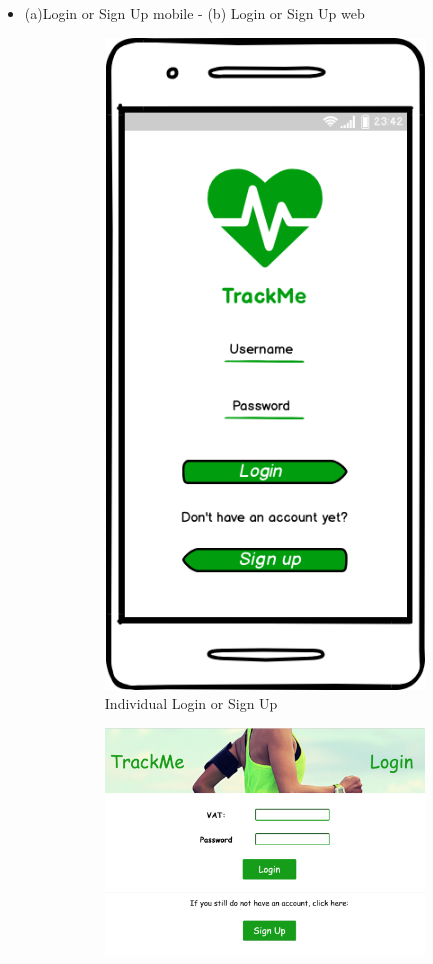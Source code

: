 \documentclass{article}
\begin{document}
\begin{legal}
\begin{legal}
\begin{legal}
{					\begin{itemize}
    					\item (a)Login or Sign Up mobile - (b) Login or Sign Up web
						\begin{figure}[H]
						\centering
						\begin{subfigure}{.5\textwidth}
  						\centering
  						\includegraphics[width=.4\linewidth]{../images/mockups/Login-Sign-up.png}
 						 \caption{Individual Login or Sign Up}
						\end{subfigure}%
						\begin{subfigure}{.5\textwidth}
 						 \centering
 						 \includegraphics[width=1.14\linewidth]{../images/mockups/Login-Sign-up-web.png}

\end{subfigure}
\end{figure}
\end{itemize}}
\end{legal}
\end{legal}
\end{legal}
\end{document}
